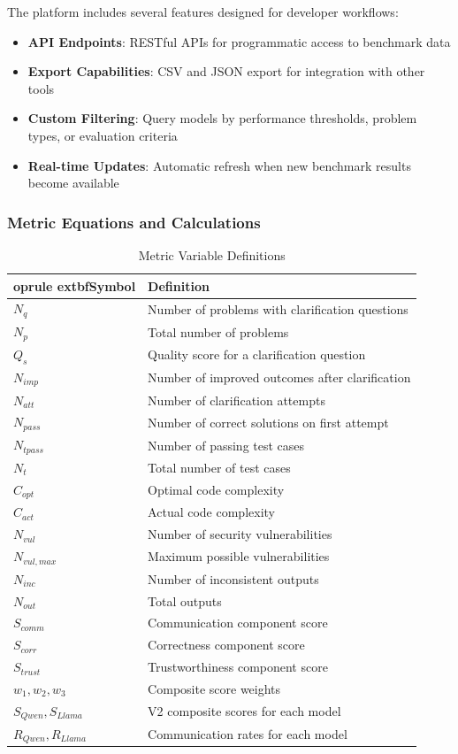 \documentclass[conference]{IEEEtran}
\begin{document}
The platform includes several features designed for developer workflows:

\begin{itemize}
    \item \textbf{API Endpoints}: RESTful APIs for programmatic access to benchmark data
    \item \textbf{Export Capabilities}: CSV and JSON export for integration with other tools
    \item \textbf{Custom Filtering}: Query models by performance thresholds, problem types, or evaluation criteria
    \item \textbf{Real-time Updates}: Automatic refresh when new benchmark results become available
\end{itemize}

\subsubsection{Metric Equations and Calculations}

\begin{table}[ht]
\centering
\caption{Metric Variable Definitions}
\begin{tabular}{ll}
	oprule
	extbf{Symbol} & \textbf{Definition} \\
\midrule
$N_{q}$ & Number of problems with clarification questions \\
$N_{p}$ & Total number of problems \\
$Q_{s}$ & Quality score for a clarification question \\
$N_{imp}$ & Number of improved outcomes after clarification \\
$N_{att}$ & Number of clarification attempts \\
$N_{pass}$ & Number of correct solutions on first attempt \\
$N_{tpass}$ & Number of passing test cases \\
$N_{t}$ & Total number of test cases \\
$C_{opt}$ & Optimal code complexity \\
$C_{act}$ & Actual code complexity \\
$N_{vul}$ & Number of security vulnerabilities \\
$N_{vul,max}$ & Maximum possible vulnerabilities \\
$N_{inc}$ & Number of inconsistent outputs \\
$N_{out}$ & Total outputs \\
$S_{comm}$ & Communication component score \\
$S_{corr}$ & Correctness component score \\
$S_{trust}$ & Trustworthiness component score \\
$w_1, w_2, w_3$ & Composite score weights \\
$S_{Qwen}, S_{Llama}$ & V2 composite scores for each model \\
$R_{Qwen}, R_{Llama}$ & Communication rates for each model \\
\bottomrule
\end{tabular}
\label{tab:variables}
\end{table}
\end{document}
